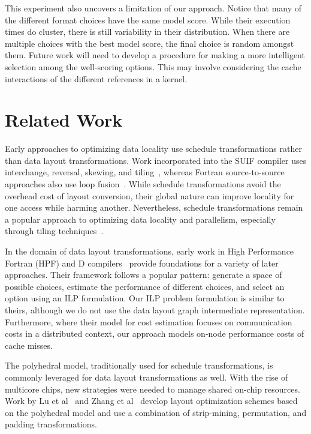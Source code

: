 \documentclass[sigconf,review=true]{acmart}
\begin{document}
This experiment also uncovers a limitation of our approach.
Notice that many of the different format choices have the same model score.
While their execution times do cluster, there is still variability in their distribution.
When there are multiple choices with   the best model score, the final choice is random amongst them.
Future work will need to develop a procedure for making a more intelligent selection among the well-scoring options. 
This may involve considering the cache interactions of the different references in a kernel. 





\section{Related Work}

Early approaches to optimizing data locality use schedule transformations rather than data layout transformations. 
Work incorporated into the SUIF compiler uses interchange, reversal, skewing, and tiling~\cite{wolf1991data}, whereas Fortran source-to-source approaches also use loop fusion~\cite{mckinley1996improving}.
While schedule transformations avoid the overhead cost of layout conversion, their global nature can improve locality for one access while harming another.
Nevertheless, schedule transformations remain a popular approach to optimizing data locality and parallelism, 
especially through tiling techniques~\cite{bondhugula2008pluto,bertolacci2015parameterized,bondhugula2016diamond,bandishti2012tiling,unat2016tida}.

In the domain of data layout transformations, early work in High Performance Fortran (HPF) and D compilers~\cite{bixby1994automatic,kennedy1995automatic,kennedy1998automatic} provide foundations for a variety of later approaches.
Their framework follows a popular pattern: generate a space of possible choices, estimate the performance of different choices, and select an option using an ILP formulation. 
Our ILP problem formulation is similar to theirs, although we do not use the data layout graph intermediate representation.
Furthermore, where their model for cost estimation focuses on communication costs in a distributed context, our approach models on-node performance costs of cache misses.

The polyhedral model, traditionally used for schedule transformations, is commonly leveraged for data layout transformations as well.
With the rise of multicore chips, new strategies were needed to manage shared on-chip resources. 
Work by Lu et al~\cite{lu2009data} and Zhang et al~\cite{zhang2011optimizing} develop layout optimization schemes based on the polyhedral model and use a combination of strip-mining, permutation, and padding transformations.
\end{document}
